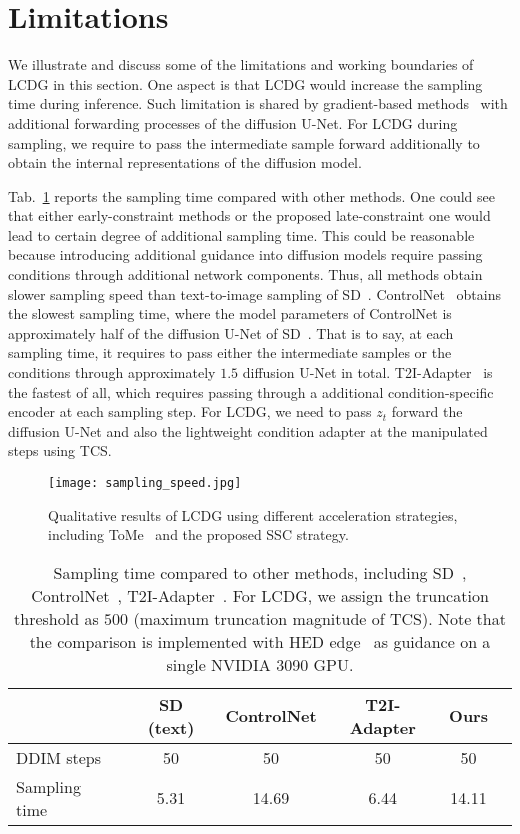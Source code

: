 \documentclass{article}
\begin{document}
\section{Limitations}
\label{limitations}

We illustrate and discuss some of the limitations and working boundaries of LCDG in this section. One aspect is that LCDG would increase the sampling time during inference. Such limitation is shared by gradient-based methods~\cite{dhariwal2021diffusion,ho2022classifier} with additional forwarding processes of the diffusion U-Net. For LCDG during sampling, we require to pass the intermediate sample forward additionally to obtain the internal representations of the diffusion model. 



Tab.~\ref{table:sampling time} reports the sampling time compared with other methods. One could see that either early-constraint methods or the proposed late-constraint one would lead to certain degree of additional sampling time. This could be reasonable because introducing additional guidance into diffusion models require passing conditions through additional network components. Thus, all methods obtain slower sampling speed than text-to-image sampling of SD~\cite{rombach2022high}. ControlNet~\cite{zhang2023adding} obtains the slowest sampling time, where the model parameters of ControlNet is approximately half of the diffusion U-Net of SD~\cite{rombach2022high}. That is to say, at each sampling time, it requires to pass either the intermediate samples or the conditions through approximately $1.5$ diffusion U-Net in total. T2I-Adapter~\cite{mou2023t2i} is the fastest of all, which requires passing through a additional condition-specific encoder at each sampling step. For LCDG, we need to pass $z_t$ forward the diffusion U-Net and also the lightweight condition adapter at the manipulated steps using TCS.

\begin{figure*}[t!]
  \centering
  \texttt{[image: sampling\_speed.jpg]} \caption{Qualitative results of LCDG using different acceleration strategies, including ToMe~\cite{bolya2022token} and the proposed SSC strategy.}
  \label{figure:sampling speed}
  \end{figure*}

\begin{table}[h]
  \centering
\caption{Sampling time compared to other methods, including SD~\cite{rombach2022high}, ControlNet~\cite{zhang2023adding}, T2I-Adapter~\cite{mou2023t2i}. For LCDG, we assign the truncation threshold as $500$ (maximum truncation magnitude of TCS). Note that the comparison is implemented with HED edge~\cite{xie2015holistically} as guidance on a single NVIDIA 3090 GPU.}
\begin{tabular}{lccccc}
   \toprule
   &SD (text)&ControlNet&T2I-Adapter&Ours\\
   \midrule 
   DDIM steps    & 50 & 50 & 50 & 50 \\
   Sampling time    & 5.31 & 14.69 & 6.44 & 14.11 \\
\bottomrule
\end{tabular}
  \label{table:sampling time}
\end{table}
\end{document}
